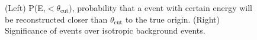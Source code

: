 \begin{figure}[t]
\caption{\label{FIG::VERITAS::ANGULAR} (Left) P(E,$<\theta_\mathrm{cut}$), 
probability that a \Gray event with certain energy will be
reconstructed closer than $\theta_\mathrm{cut}$ to the true
origin. (Right) Significance of \Gray events over isotropic background
events.}
\end{figure}

